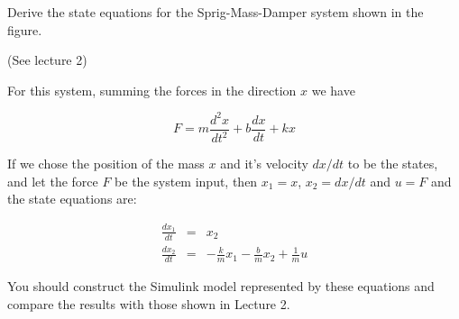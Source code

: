 \begin{slide}
	Derive the state equations for the Sprig-Mass-Damper system shown in the figure.
	\begin{center}
	\end{center}
	(See lecture 2)
\end{slide}

For this system, summing the forces in the direction $x$ we have

$$F = m\frac{d^2x}{dt^2} + b\frac{dx}{dt} + kx$$

If we chose the position of the mass $x$ and it's velocity $dx/dt$ to be the states, and let the force $F$ be the system input, then $x_1 = x$, $x_2 = dx/dt$ and $u=F$ and the state equations are:

\begin{eqnarray*}
	\frac{dx_1}{dt} & = & x_2 \\
	\frac{dx_2}{dt} & = & -\frac{k}{m} x_1 -\frac{b}{m} x_2 + \frac{1}{m} u
\end{eqnarray*}

You should construct the Simulink model represented by these equations and compare the results with those shown in Lecture 2.

